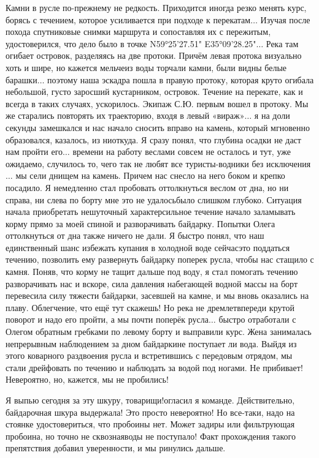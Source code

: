 Камни в русле по-прежнему не редкость. Приходится иногда резко менять курс, борясь с течением, которое усиливается при подходе к перекатам$\ldots$ Изучая после похода спутниковые снимки маршрута и сопоставляя их с пережитым, удостоверился, что дело было в точке N59°25'27.51" E35°09'28.25"$\ldots$ Река там огибает островок, разделяясь на две протоки. Причём левая протока визуально хоть и шире, но кажется мельче\mdash из воды торчали камни, были видны белые барашки$\ldots$ поэтому наша эскадра пошла в правую протоку, которая круто огибала небольшой, густо заросший кустарником, островок. Течение на перекате, как и всегда в таких случаях, ускорилось. Экипаж С.Ю. первым вошел в протоку. Мы же старались повторять их траекторию, входя в левый «вираж»$\ldots$ я на доли секунды замешкался и нас начало сносить вправо на камень, который мгновенно образовался, казалось, из ниоткуда. Я сразу понял, что глубина осадки не даст нам пройти его$\ldots$ времени на работу веслами совсем не осталось и тут, уже ожидаемо, случилось то, чего так не любят все туристы-водники без исключения$\ldots$ мы сели днищем на камень. Причем нас снесло на него боком и крепко посадило. Я немедленно стал пробовать оттолкнуться веслом от дна, но ни справа, ни слева по борту мне это не удалось\mdash было слишком глубоко. Ситуация начала приобретать нешуточный характер\mdash сильное течение начало заламывать корму прямо за моей спиной и разворачивать байдарку. Попытки Олега оттолкнуться от дна также ничего не дали. Я быстро понял, что наш единственный шанс избежать купания в холодной воде сейчас\mdash это поддаться течению, позволить ему развернуть байдарку поперек русла, чтобы нас стащило с камня. Поняв, что корму не тащит дальше под воду, я стал помогать течению разворачивать нас и вскоре, сила давления набегающей водной массы на борт перевесила силу тяжести байдарки, засевшей на камне, и мы вновь оказались на плаву. Облегчение, что ещё тут скажешь! Но река не дремлет\mdash впереди крутой поворот и надо его пройти, а мы почти поперёк русла$\ldots$ быстро отработали с Олегом обратным гребками по левому борту и выправили курс. Жена занималась непрерывным наблюдением за дном байдарки\mdash не поступает ли вода. Выйдя из этого коварного раздвоения русла и встретившись с передовым отрядом, мы стали дрейфовать по течению и наблюдать за водой под ногами. Не прибивает! Невероятно, но, кажется, мы не пробились! 

\mdash Я выпью сегодня за эту шкуру, товарищи!\mdash огласил я команде. 
Действительно, байдарочная шкура выдержала! Это просто невероятно! Но все-таки, надо на стоянке удостовериться, что пробоины нет. Может задиры или фильтрующая пробоина, но точно не сквозная\mdash воды не поступало! Факт прохождения такого препятствия добавил уверенности, и мы ринулись дальше.

